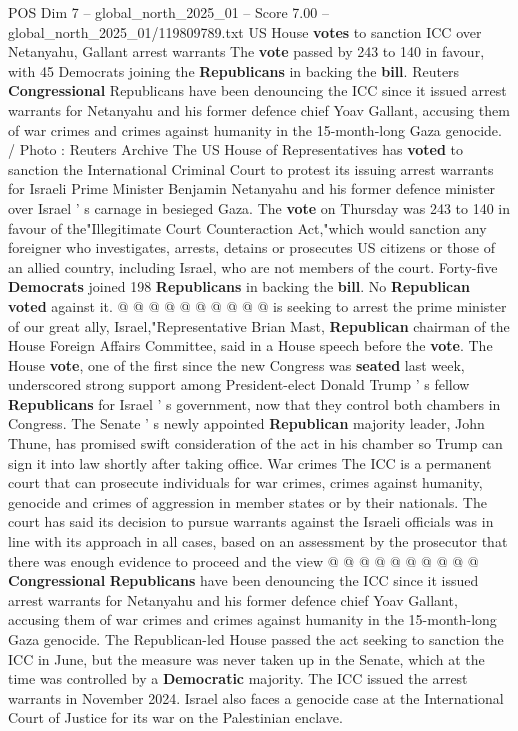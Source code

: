 \begin{textsample}{POS Dim 7 – global\_north\_2025\_01 – Score 7.00 – global\_north\_2025\_01/119809789.txt}  \label{ex:f7_pos_269}
US House \textbf{votes} to sanction ICC over Netanyahu, Gallant arrest warrants The \textbf{vote} passed by 243 to 140 in favour, with 45 Democrats joining the \textbf{Republicans} in backing the \textbf{bill}.
Reuters \textbf{Congressional} Republicans have been denouncing the ICC since it issued arrest warrants for Netanyahu and his former defence chief Yoav Gallant, accusing them of war crimes and crimes against humanity in the 15-month-long Gaza genocide. / Photo : Reuters Archive The US House of Representatives has \textbf{voted} to sanction the International Criminal Court to protest its issuing arrest warrants for Israeli Prime Minister Benjamin Netanyahu and his former defence minister over Israel ' s carnage in besieged Gaza.
The \textbf{vote} on Thursday was 243 to 140 in favour of the"Illegitimate Court Counteraction Act,"which would sanction any foreigner who investigates, arrests, detains or prosecutes US citizens or those of an allied country, including Israel, who are not members of the court.
Forty-five \textbf{Democrats} joined 198 \textbf{Republicans} in backing the \textbf{bill}.
No \textbf{Republican} \textbf{voted} against it. @ @ @ @ @ @ @ @ @ @ is seeking to arrest the prime minister of our great ally, Israel,"Representative Brian Mast, \textbf{Republican} chairman of the House Foreign Affairs Committee, said in a House speech before the \textbf{vote}.
The House \textbf{vote}, one of the first since the new Congress was \textbf{seated} last week, underscored strong support among President-elect Donald Trump ' s fellow \textbf{Republicans} for Israel ' s government, now that they control both chambers in Congress.
The Senate ' s newly appointed \textbf{Republican} majority leader, John Thune, has promised swift consideration of the act in his chamber so Trump can sign it into law shortly after taking office.
War crimes The ICC is a permanent court that can prosecute individuals for war crimes, crimes against humanity, genocide and crimes of aggression in member states or by their nationals.
The court has said its decision to pursue warrants against the Israeli officials was in line with its approach in all cases, based on an assessment by the prosecutor that there was enough evidence to proceed and the view @ @ @ @ @ @ @ @ @ @ \textbf{Congressional} \textbf{Republicans} have been denouncing the ICC since it issued arrest warrants for Netanyahu and his former defence chief Yoav Gallant, accusing them of war crimes and crimes against humanity in the 15-month-long Gaza genocide.
The Republican-led House passed the act seeking to sanction the ICC in June, but the measure was never taken up in the Senate, which at the time was controlled by a \textbf{Democratic} majority.
The ICC issued the arrest warrants in November 2024.
Israel also faces a genocide case at the International Court of Justice for its war on the Palestinian enclave.

\end{textsample}
